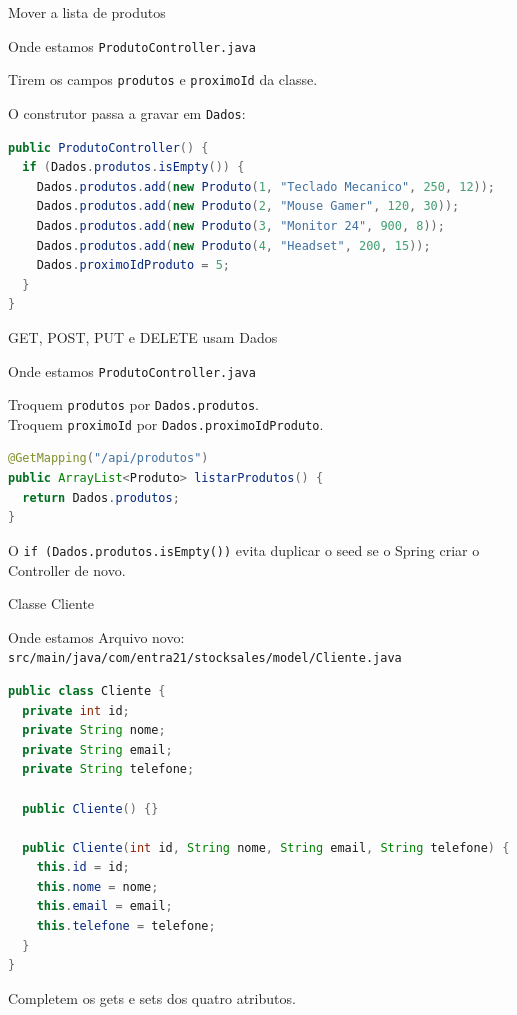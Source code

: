 \documentclass[aspectratio=169,11pt]{beamer}
\newcommand{\onde}[1]{%
  \begin{block}{Onde estamos}
    #1
  \end{block}
}
\begin{document}
\begin{frame}[fragile]{Mover a lista de produtos}
  \onde{\texttt{ProdutoController.java}}

  Tirem os campos \texttt{produtos} e \texttt{proximoId}
  da classe.

  \vspace{0.3em}
  O construtor passa a gravar em \texttt{Dados}:

\begin{lstlisting}[language=Java,basicstyle=\ttfamily\scriptsize]
public ProdutoController() {
  if (Dados.produtos.isEmpty()) {
    Dados.produtos.add(new Produto(1, "Teclado Mecanico", 250, 12));
    Dados.produtos.add(new Produto(2, "Mouse Gamer", 120, 30));
    Dados.produtos.add(new Produto(3, "Monitor 24", 900, 8));
    Dados.produtos.add(new Produto(4, "Headset", 200, 15));
    Dados.proximoIdProduto = 5;
  }
}
\end{lstlisting}
\end{frame}

\begin{frame}[fragile]{GET, POST, PUT e DELETE usam Dados}
  \onde{\texttt{ProdutoController.java}}

  Troquem \texttt{produtos} por \texttt{Dados.produtos}.\\
  Troquem \texttt{proximoId} por \texttt{Dados.proximoIdProduto}.

\begin{lstlisting}[language=Java,basicstyle=\ttfamily\footnotesize]
@GetMapping("/api/produtos")
public ArrayList<Produto> listarProdutos() {
  return Dados.produtos;
}
\end{lstlisting}

  \vspace{0.4em}
  O \texttt{if (Dados.produtos.isEmpty())} evita duplicar
  o seed se o Spring criar o Controller de novo.
\end{frame}

\begin{frame}[fragile]{Classe Cliente}
  \onde{Arquivo novo:\\
        \texttt{src/main/java/com/entra21/stocksales/model/Cliente.java}}

\begin{lstlisting}[language=Java,basicstyle=\ttfamily\scriptsize]
public class Cliente {
  private int id;
  private String nome;
  private String email;
  private String telefone;

  public Cliente() {}

  public Cliente(int id, String nome, String email, String telefone) {
    this.id = id;
    this.nome = nome;
    this.email = email;
    this.telefone = telefone;
  }
}
\end{lstlisting}

  Completem os gets e sets dos quatro atributos.
\end{frame}
\end{document}
